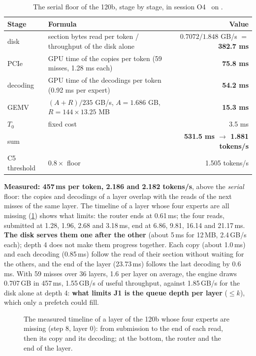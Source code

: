 \begin{table}[ht]
\centering\small
\caption[The serial floor of the 120b]{The serial floor of the 120b, stage by stage, in session O4 \calc~on \mes.}
\label{tab:t2o-c5}
\begin{tabular}{@{}llr@{}}
\toprule
Stage & Formula & Value \\
\midrule
disk & section bytes read per token / throughput of the disk alone & $0.7072 / 1.848$ GB/s $=$ \textbf{382.7 ms} \\
PCIe & GPU time of the copies per token (59 misses, 1.28 ms each) & \textbf{75.8 ms} \\
decoding & GPU time of the decodings per token (0.92 ms per expert) & \textbf{54.2 ms} \\
GEMV & $(A + R)/235$ GB/s, $A = 1.686$ GB, $R = 144 \times 13.25$ MB & \textbf{15.3 ms} \\
$T_0$ & fixed cost & 3.5 ms \\
\midrule
sum & & \textbf{531.5 ms $\to$ 1.881 tokens/s} \\
C5 threshold & $0.8 \times$ floor & 1.505 tokens/s \\
\bottomrule
\end{tabular}
\end{table}

\textbf{Measured: 457\,ms per token, 2.186 and 2.182 tokens/s}, above the \emph{serial} floor: the copies and decodings of a layer overlap with the reads of the next misses of the same layer. The timeline of a layer whose four experts are all missing (\cref{fig:t2o-chrono}) shows what limits: the router ends at 0.61\,ms; the four reads, submitted at 1.28, 1.96, 2.68 and 3.18\,ms, end at 6.86, 9.81, 16.14 and 21.17\,ms. \textbf{The disk serves them one after the other} (about 5\,ms for 12\,MB, 2.4\,GB/s each); depth 4 does not make them progress together. Each copy (about 1.0\,ms) and each decoding (0.85\,ms) follow the read of their section without waiting for the others, and the end of the layer (23.73\,ms) follows the last decoding by 0.6\,ms. With 59 misses over 36 layers, 1.6 per layer on average, the engine draws 0.707\,GB in 457\,ms, 1.55\,GB/s of useful throughput, against 1.85\,GB/s for the disk alone at depth 4: \textbf{what limits J1 is the queue depth per layer} ($\le k$), which only a prefetch could fill.

\begin{figure}[ht]
\centering
\GrapheCchChrono
\caption[The measured timeline of a layer]{The measured timeline of a layer of the 120b whose four experts are missing (step 8, layer 0): from submission to the end of each read, then its copy and its decoding; at the bottom, the router and the end of the layer.}
\label{fig:t2o-chrono}
\end{figure}

